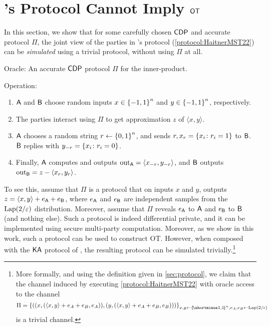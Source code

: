 \section{\cite{HaitnerMST22}'s Protocol Cannot Imply ${\sf OT}$}\label{appendix:HaitnerMST22}

In this section, we show that for some carefully chosen ${\sf CDP}$ and accurate protocol $\Pi$, the joint view of the parties in \cite{HaitnerMST22}'s protocol (\cref{protocol:HaitnerMST22}) can be \emph{simulated} using a trivial protocol, without using $\Pi$ at all.

\begin{protocol}\label{protocol:HaitnerMST22}
    \item Oracle: An accurate ${\sf CDP}$ protocol $\Pi$ for the inner-product.
    \item Operation:~
    \begin{enumerate}
        \item $\mathsf{A}$ and $\mathsf{B}$ choose random inputs $x\in \set{-1,1}^n$ and $y\in \set{-1,1}^n$, respectively.
        \item The parties interact using $\Pi$ to get approximation $z$ of $\langle x,y \rangle$.
        \item $\mathsf{A}$ chooses a random string $r \gets \zn$, and sends $r, x_r=\set{x_i \colon r_i=1}$ to $\mathsf{B}$. $\mathsf{B}$ replies with $y_{- r}=\set{x_i \colon r_i=0}$.
        \item Finally, $\mathsf{A}$ computes and outputs ${\rm out}_{\mathsf{A}}=\langle x_{-r},y_{-r} \rangle$, and $\mathsf{B}$ outputs ${\rm out}_{\mathsf{B}}=z-\langle x_{r},y_{r} \rangle$.
\end{enumerate}
\end{protocol}

To see this, assume that $\Pi$ is a protocol that on inputs $x$ and $y$, outputs $z=\langle x,y \rangle+e_{\mathsf{A}}+e_{\mathsf{B}}$, where $e_{\mathsf{A}}$ and $e_{\mathsf{B}}$ are independent samples from the ${\rm Lap}(2/\varepsilon)$ distribution. Moreover, assume that $\Pi$ reveals $e_{\mathsf{A}}$ to $\mathsf{A}$ and $e_{\mathsf{B}}$ to $\mathsf{B}$ (and nothing else).  Such a protocol is indeed differential private, and it can be implemented using secure multi-party computation. Moreover, as we show in this work, such a protocol can be used to construct OT. However, when composed with the ${\sf KA}$ protocol of \cite{HaitnerMST22}, the resulting protocol can be simulated trivially.\footnote{More formally, and using the definition given in \cref{sec:protocol}, we claim that the channel induced by executing \cref{protocol:HaitnerMST22} with oracle access to the channel $$\Pi=\set{((x,(\langle x,y \rangle + e_A+e_B,e_A)),(y,(\langle x,y \rangle + e_A+e_B,e_B)))}_{x,y\gets \oo^n, e_A,e_B\gets \Lap(2/\epsilon)}$$ is a trivial channel.} 

